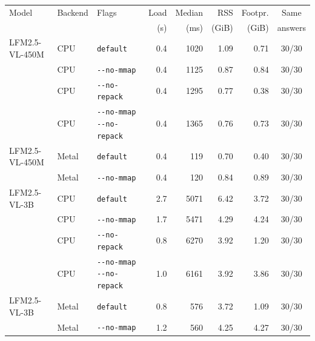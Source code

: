 \begin{tabular}{lllrrrrc}
\toprule
Model & Backend & Flags & Load & Median & RSS & Footpr. & Same \\
 & & & (s) & (ms) & (GiB) & (GiB) & answers \\
\midrule
LFM2.5-VL-450M & CPU & \texttt{default} & 0.4 & 1020 & 1.09 & 0.71 & 30/30 \\
 & CPU & \texttt{-{}-no-mmap} & 0.4 & 1125 & 0.87 & 0.84 & 30/30 \\
 & CPU & \texttt{-{}-no-repack} & 0.4 & 1295 & 0.77 & 0.38 & 30/30 \\
 & CPU & \texttt{-{}-no-mmap -{}-no-repack} & 0.4 & 1365 & 0.76 & 0.73 & 30/30 \\
\midrule
LFM2.5-VL-450M & Metal & \texttt{default} & 0.4 & 119 & 0.70 & 0.40 & 30/30 \\
 & Metal & \texttt{-{}-no-mmap} & 0.4 & 120 & 0.84 & 0.89 & 30/30 \\
\midrule
LFM2.5-VL-3B & CPU & \texttt{default} & 2.7 & 5071 & 6.42 & 3.72 & 30/30 \\
 & CPU & \texttt{-{}-no-mmap} & 1.7 & 5471 & 4.29 & 4.24 & 30/30 \\
 & CPU & \texttt{-{}-no-repack} & 0.8 & 6270 & 3.92 & 1.20 & 30/30 \\
 & CPU & \texttt{-{}-no-mmap -{}-no-repack} & 1.0 & 6161 & 3.92 & 3.86 & 30/30 \\
\midrule
LFM2.5-VL-3B & Metal & \texttt{default} & 0.8 & 576 & 3.72 & 1.09 & 30/30 \\
 & Metal & \texttt{-{}-no-mmap} & 1.2 & 560 & 4.25 & 4.27 & 30/30 \\
\bottomrule
\end{tabular}
